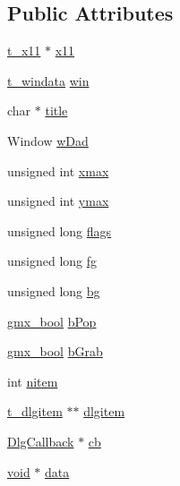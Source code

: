 \subsection*{\-Public \-Attributes}
\begin{DoxyCompactItemize}
\item 
\hyperlink{structt__x11}{t\-\_\-x11} $\ast$ \hyperlink{structt__dlg_abc3b53346014e4a820f11e6f06450201}{x11}
\item 
\hyperlink{structt__windata}{t\-\_\-windata} \hyperlink{structt__dlg_ad2567154da1ec251a29e03927e0e0112}{win}
\item 
char $\ast$ \hyperlink{structt__dlg_adcd28da7b49bcbb434f0c1b0942ed613}{title}
\item 
\-Window \hyperlink{structt__dlg_ad804e56a6131c56ea154d16e35500bc6}{w\-Dad}
\item 
unsigned int \hyperlink{structt__dlg_ad7a18e05995d04cb304b41d6fe71b3fb}{xmax}
\item 
unsigned int \hyperlink{structt__dlg_a79b7b97c6c62ef28d939529945419ea9}{ymax}
\item 
unsigned long \hyperlink{structt__dlg_ada32cdd9b9bbafb31765eecf9212eb56}{flags}
\item 
unsigned long \hyperlink{structt__dlg_ac6b5b61148ac26c964fc06109f618bed}{fg}
\item 
unsigned long \hyperlink{structt__dlg_a19eebadc7718653c5b31204f13674983}{bg}
\item 
\hyperlink{include_2types_2simple_8h_a8fddad319f226e856400d190198d5151}{gmx\-\_\-bool} \hyperlink{structt__dlg_a4fe984d272ac798c17630e4567d1e1f1}{b\-Pop}
\item 
\hyperlink{include_2types_2simple_8h_a8fddad319f226e856400d190198d5151}{gmx\-\_\-bool} \hyperlink{structt__dlg_a56b2122da21748abc3dce72f4feedb8b}{b\-Grab}
\item 
int \hyperlink{structt__dlg_a79a12fe089f063f3a921ddbb9610456c}{nitem}
\item 
\hyperlink{structt__dlgitem}{t\-\_\-dlgitem} $\ast$$\ast$ \hyperlink{structt__dlg_a3cff6051619f04378f149ad5a10b2f6a}{dlgitem}
\item 
\hyperlink{xdlg_8h_a5c5a519f0378b9db5d5483f49cb46017}{\-Dlg\-Callback} $\ast$ \hyperlink{structt__dlg_af4774638780f7d8ed0ee3bb14063495b}{cb}
\item 
\hyperlink{nbnxn__kernel__simd__4xn__outer_8h_a8dc3f4a797ed992dff49d2fa3477eee8}{void} $\ast$ \hyperlink{structt__dlg_abe41aef51e7662eab5f67318461e3949}{data}
\end{DoxyCompactItemize}


